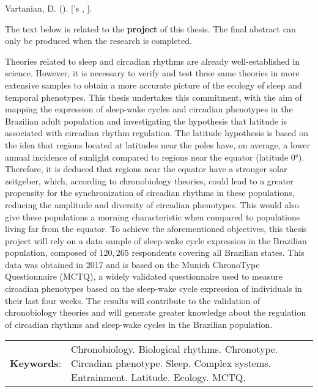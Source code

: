 \begin{resumoenv}[\resumoname]
Vartanian, D. ({\imprimirdata}). \textit{\imprimirtitulo} [{\imprimirtipodetituloacademico}'s {\imprimirtipotrabalho}, {\imprimiruniversidade}].


The text below is related to the \textbf{project} of this thesis. The
final abstract can only be produced when the research is completed.

Theories related to sleep and circadian rhythms are already
well-established in science. However, it is necessary to verify and test
these same theories in more extensive samples to obtain a more accurate
picture of the ecology of sleep and temporal phenotypes. This thesis
undertakes this commitment, with the aim of mapping the expression of
sleep-wake cycles and circadian phenotypes in the Brazilian adult
population and investigating the hypothesis that latitude is associated
with circadian rhythm regulation. The latitude hypothesis is based on
the idea that regions located at latitudes near the poles have, on
average, a lower annual incidence of sunlight compared to regions near
the equator (latitude 0°). Therefore, it is deduced that regions near
the equator have a stronger solar zeitgeber, which, according to
chronobiology theories, could lead to a greater propensity for the
synchronization of circadian rhythms in these populations, reducing the
amplitude and diversity of circadian phenotypes. This would also give
these populations a morning characteristic when compared to populations
living far from the equator. To achieve the aforementioned objectives,
this thesis project will rely on a data sample of sleep-wake cycle
expression in the Brazilian population, composed of \(120,265\)
respondents covering all Brazilian states. This data was obtained in
2017 and is based on the Munich ChronoType Questionnaire (MCTQ), a
widely validated questionnaire used to measure circadian phenotypes
based on the sleep-wake cycle expression of individuals in their last
four weeks. The results will contribute to the validation of
chronobiology theories and will generate greater knowledge about the
regulation of circadian rhythms and sleep-wake cycles in the Brazilian
population.


\begin{tabular}{p{2.3cm} p{13.6cm}}
  \textbf{Keywords}: & Chronobiology. Biological rhythms. Chronotype. Circadian phenotype. Sleep. Complex systems. Entrainment. Latitude. Ecology. MCTQ.
\end{tabular}
\end{resumoenv}

